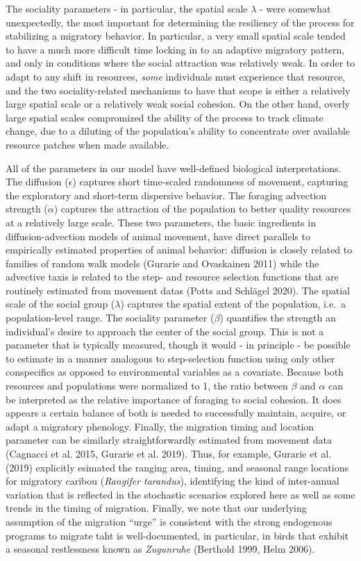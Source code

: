 \documentclass[12pt]{article}
\begin{document}
The sociality parameters - in particular, the spatial scale \(\lambda\)
- were somewhat unexpectedly, the most important for determining the
resiliency of the process for stabilizing a migratory behavior. In
particular, a very small spatial scale tended to have a much more
difficult time locking in to an adaptive migratory pattern, and only in
conditions where the social attraction was relatively weak. In order to
adapt to any shift in resources, \emph{some} individuals must experience
that resource, and the two sociality-related mechanisms to have that
scope is either a relatively large spatial scale or a relatively weak
social cohesion. On the other hand, overly large spatial scales
compromized the ability of the process to track climate change, due to a
diluting of the population's ability to concentrate over available
resource patches when made available.

All of the parameters in our model have well-defined biological
interpretations. The diffusion (\(\epsilon\)) captures short time-scaled
randomness of movement, capturing the exploratory and short-term
dispersive behavior. The foraging advection strength (\(\alpha\))
captures the attraction of the population to better quality resources at
a relatively large scale. These two parameters, the basic ingredients in
diffusion-advection models of animal movement, have direct parallels to
empirically estimated properties of animal behavior: diffusion is
closely related to families of random walk models (Gurarie and
Ovaskainen 2011) while the advective taxis is related to the step- and
resource selection functions that are routinely estimated from movement
datas (Potts and Schlägel 2020). The spatial scale of the social group
(\(\lambda\)) captures the spatial extent of the population, i.e.~a
population-level range. The sociality parameter (\(\beta\)) quantifies
the strength an individual's desire to approach the center of the social
group. This is not a parameter that is typically measured, though it
would - in principle - be possible to estimate in a manner analogous to
step-selection function using only other conspecifics as opposed to
environmental variables as a covariate. Because both resources and
populations were normalized to 1, the ratio between \(\beta\) and
\(\alpha\) can be interpreted as the relative importance of foraging to
social cohesion. It does appears a certain balance of both is needed to
successfully maintain, acquire, or adapt a migratory phenology. Finally,
the migration timing and location parameter can be similarly
straightforwardly estimated from movement data (Cagnacci et al. 2015,
Gurarie et al. 2019). Thus, for example, Gurarie et al. (2019)
explicitly esimated the ranging area, timing, and seasonal range
locations for migratory caribou (\emph{Rangifer tarandus}), identifying
the kind of inter-annual variation that is reflected in the stochastic
scenarios explored here as well as some trends in the timing of
migration. Finally, we note that our underlying assumption of the
migration ``urge'' is consistent with the strong endogenous programs to
migrate taht is well-documented, in particular, in birds that exhibit a
seasonal restlessness known as \emph{Zugunruhe} (Berthold 1999, Helm
2006).
\end{document}
